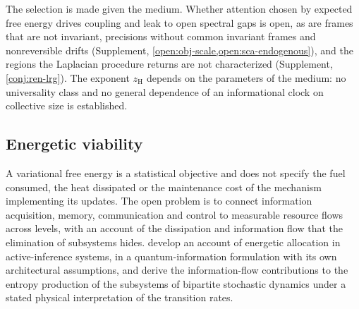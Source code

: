 The selection is made given the medium. Whether attention chosen by expected free energy drives coupling and leak to open spectral gaps is open, as are frames that are not invariant, precisions without common invariant frames and nonreversible drifts (Supplement, \cref{open:obj-scale,open:sca-endogenous}), and the regions the Laplacian procedure returns are not characterized (Supplement, \cref{conj:ren-lrg}). The exponent $z_{\mathrm H}$ depends on the parameters of the medium: no universality class and no general dependence of an informational clock on collective size is established.

\subsection{Energetic viability}\label{sec:opn-8}

A variational free energy is a statistical objective and does not specify the fuel consumed, the heat dissipated or the maintenance cost of the mechanism implementing its updates. The open problem is to connect information acquisition, memory, communication and control to measurable resource flows across levels, with an account of the dissipation and information flow that the elimination of subsystems hides. \citet{fields2024making} develop an account of energetic allocation in active-inference systems, in a quantum-information formulation with its own architectural assumptions, and \citet{horowitz2014thermodynamics} derive the information-flow contributions to the entropy production of the subsystems of bipartite stochastic dynamics under a stated physical interpretation of the transition rates.

